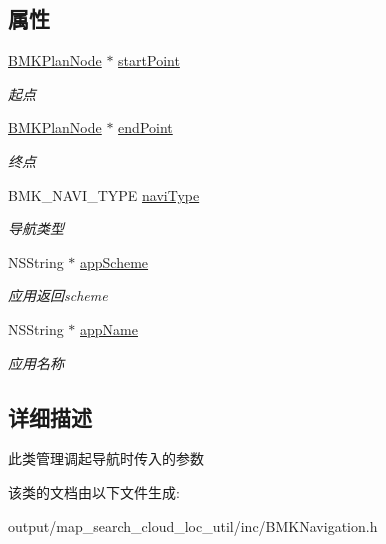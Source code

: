 \subsection*{属性}
\begin{DoxyCompactItemize}
\item 
\hypertarget{interface_b_m_k_navi_para_aafbed621fc51d1fe9a24b007f06635fb}{\hyperlink{interface_b_m_k_plan_node}{B\+M\+K\+Plan\+Node} $\ast$ \hyperlink{interface_b_m_k_navi_para_aafbed621fc51d1fe9a24b007f06635fb}{start\+Point}}\label{interface_b_m_k_navi_para_aafbed621fc51d1fe9a24b007f06635fb}

\begin{DoxyCompactList}\small\item\em 起点 \end{DoxyCompactList}\item 
\hypertarget{interface_b_m_k_navi_para_a6c47b9b500a1361c81843dde65b79928}{\hyperlink{interface_b_m_k_plan_node}{B\+M\+K\+Plan\+Node} $\ast$ \hyperlink{interface_b_m_k_navi_para_a6c47b9b500a1361c81843dde65b79928}{end\+Point}}\label{interface_b_m_k_navi_para_a6c47b9b500a1361c81843dde65b79928}

\begin{DoxyCompactList}\small\item\em 终点 \end{DoxyCompactList}\item 
\hypertarget{interface_b_m_k_navi_para_abbc3ff6ed83b98d211205ebf2153fe2b}{B\+M\+K\+\_\+\+N\+A\+V\+I\+\_\+\+T\+Y\+P\+E \hyperlink{interface_b_m_k_navi_para_abbc3ff6ed83b98d211205ebf2153fe2b}{navi\+Type}}\label{interface_b_m_k_navi_para_abbc3ff6ed83b98d211205ebf2153fe2b}

\begin{DoxyCompactList}\small\item\em 导航类型 \end{DoxyCompactList}\item 
\hypertarget{interface_b_m_k_navi_para_aa6d336d0e092b0624c49cacf73141bee}{N\+S\+String $\ast$ \hyperlink{interface_b_m_k_navi_para_aa6d336d0e092b0624c49cacf73141bee}{app\+Scheme}}\label{interface_b_m_k_navi_para_aa6d336d0e092b0624c49cacf73141bee}

\begin{DoxyCompactList}\small\item\em 应用返回scheme \end{DoxyCompactList}\item 
\hypertarget{interface_b_m_k_navi_para_a4c98f8aca9d18fd287e345aaffff4f1c}{N\+S\+String $\ast$ \hyperlink{interface_b_m_k_navi_para_a4c98f8aca9d18fd287e345aaffff4f1c}{app\+Name}}\label{interface_b_m_k_navi_para_a4c98f8aca9d18fd287e345aaffff4f1c}

\begin{DoxyCompactList}\small\item\em 应用名称 \end{DoxyCompactList}\end{DoxyCompactItemize}


\subsection{详细描述}
此类管理调起导航时传入的参数 

该类的文档由以下文件生成\+:\begin{DoxyCompactItemize}
\item 
output/map\+\_\+search\+\_\+cloud\+\_\+loc\+\_\+util/inc/B\+M\+K\+Navigation.\+h\end{DoxyCompactItemize}
